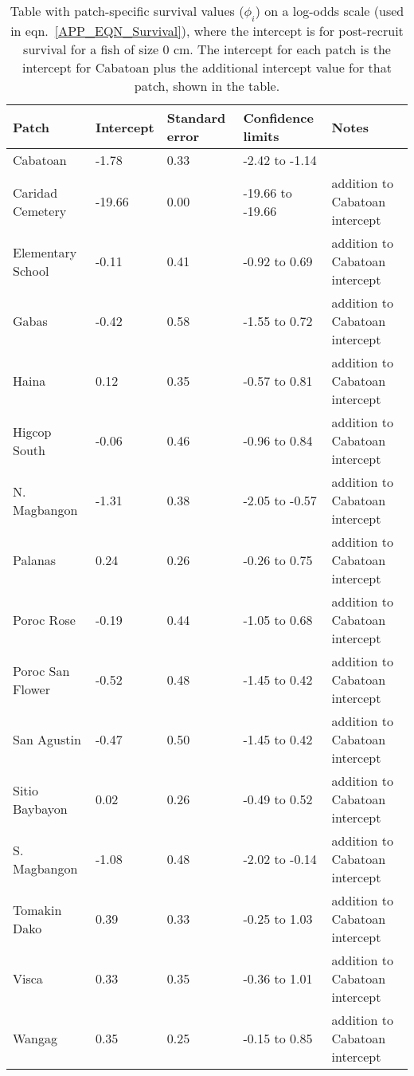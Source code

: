 \documentclass[12pt, oneside]{article}   	%
\begin{document}
\begin{table}[!htbp] 
\begin{centering}
\caption{Table with patch-specific survival values ($\phi_i$) on a log-odds scale (used in eqn.\ \ref{APP_EQN_Survival}), where the intercept is for post-recruit survival for a fish of size 0 cm. The intercept for each patch is the intercept for Cabatoan plus the additional intercept value for that patch, shown in the table.} \label{APP_TAB_SiteSurvivals}
\begin{tabular}{|p{1.1in}|p{0.75in}|p{0.75in}|p{1.25in}|p{1.5in}|}
\hline 
\textbf{Patch} & \textbf{Intercept} & \textbf{Standard error} & \textbf{Confidence limits} & \textbf{Notes} \\ \hline
Cabatoan & -1.78 & 0.33 & -2.42 to -1.14 & \\ \hline
Caridad Cemetery & -19.66 & 0.00 & -19.66 to -19.66 & addition to Cabatoan intercept \\ \hline
Elementary School & -0.11 & 0.41 & -0.92 to 0.69 & addition to Cabatoan intercept \\ \hline
Gabas & -0.42 & 0.58 & -1.55 to 0.72 & addition to Cabatoan intercept \\ \hline
Haina & 0.12 & 0.35 & -0.57 to 0.81 & addition to Cabatoan intercept \\ \hline
Higcop South & -0.06 & 0.46 & -0.96 to 0.84 & addition to Cabatoan intercept \\ \hline
N. Magbangon & -1.31 & 0.38 & -2.05 to -0.57 & addition to Cabatoan intercept \\ \hline
Palanas & 0.24 & 0.26 & -0.26 to 0.75 & addition to Cabatoan intercept \\ \hline
Poroc Rose & -0.19 & 0.44 & -1.05 to 0.68 & addition to Cabatoan intercept \\ \hline
Poroc San Flower & -0.52 & 0.48 & -1.45 to 0.42 & addition to Cabatoan intercept \\ \hline
San Agustin & -0.47 & 0.50 & -1.45 to 0.42 & addition to Cabatoan intercept \\ \hline
Sitio Baybayon & 0.02 & 0.26 & -0.49 to 0.52 & addition to Cabatoan intercept \\ \hline
S. Magbangon & -1.08 & 0.48 & -2.02 to -0.14 & addition to Cabatoan intercept \\ \hline
Tomakin Dako & 0.39 & 0.33 & -0.25 to 1.03 & addition to Cabatoan intercept \\ \hline
Visca & 0.33 & 0.35 & -0.36 to 1.01 & addition to Cabatoan intercept \\ \hline
Wangag & 0.35 & 0.25 & -0.15 to 0.85 & addition to Cabatoan intercept \\ \hline
\end{tabular}
\end{centering}
\end{table}
\end{document}
